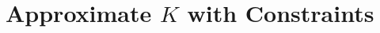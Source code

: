 \documentclass[twocolumn,a4paper]{article}
\begin{document}
\section{Approximate $K$ with Constraints}





\end{document}
